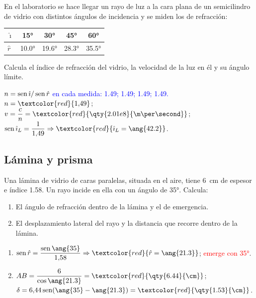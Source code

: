 \begin{exercise}
    En el laboratorio se hace llegar un rayo de luz a la cara plana de un semicilindro de vidrio con distintos ángulos de
    incidencia y se miden los de refracción:
    \begin{center}
        \begin{tabular}{@{}lcccc@{}}
            \toprule
            \(\hat{\imath}\) & \ang{15} & \ang{30} & \ang{45} & \ang{60} \\
            \midrule
            \(\hat r\) & \ang{10.0} & \ang{19.6} & \ang{28.3} & \ang{35.5} \\
            \bottomrule
        \end{tabular}
    \end{center}
    Calcula el índice de refracción del vidrio, la velocidad de la luz en él y su ángulo límite.
    \begin{solu}
        \textcolor{blue}{\(n = \operatorname{sen}\hat{\imath}/\operatorname{sen}\hat r\) en cada medida: \num{1.49}; \num{1.49}; \num{1.49}; \num{1.49}.}
        \(n = \textcolor{red}{1{,}49}\); \(v = \dfrac{c}{n} = \textcolor{red}{\qty{2.01e8}{\m\per\second}}\);
        \(\sen\hat{\imath}_L = \dfrac{1}{1{,}49} \Rightarrow \textcolor{red}{\hat{\imath}_L = \ang{42.2}}\).
    \end{solu}
\end{exercise}

\subsection{Lámina y prisma}

\begin{exercise}
    Una lámina de vidrio de caras paralelas, situada en el aire, tiene \qty{6}{\cm} de espesor e índice \num{1.58}. Un rayo
    incide en ella con un ángulo de \ang{35}. Calcula:
    \begin{enumerate}[label=\letraminuscula]
        \item El ángulo de refracción dentro de la lámina y el de emergencia.
        \item El desplazamiento lateral del rayo y la distancia que recorre dentro de la lámina.
    \end{enumerate}
    \begin{solu}
        \begin{enumerate}[label=\letraminuscula]
            \item \(\sen\hat r = \dfrac{\sen\ang{35}}{1{,}58} \Rightarrow \textcolor{red}{\hat r = \ang{21.3}}\); \textcolor{red}{emerge con \ang{35}}.
            \item \(AB = \dfrac{6}{\cos\ang{21.3}} = \textcolor{red}{\qty{6.44}{\cm}}\);
            \(\delta = 6{,}44\sen(\ang{35} - \ang{21.3}) = \textcolor{red}{\qty{1.53}{\cm}}\).
        \end{enumerate}
    \end{solu}
\end{exercise}

